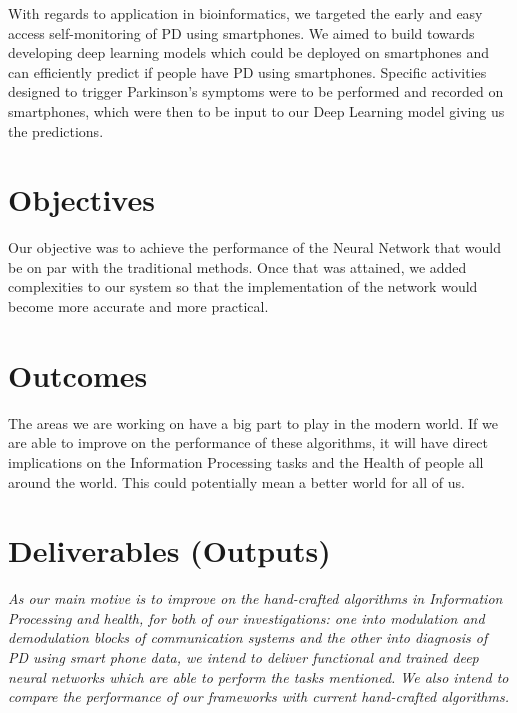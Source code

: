 With regards to application in bioinformatics, we targeted the early and easy access self-monitoring of PD using smartphones. We aimed to build towards developing deep learning models which could be deployed on smartphones and can efficiently predict if people have PD using smartphones. Specific activities designed to trigger Parkinson's symptoms were to be performed and recorded on smartphones, which were then to be input to our Deep Learning model giving us the predictions.
\section{Objectives}
Our objective was to achieve the performance of the Neural Network that would be on par with the traditional methods. Once that was attained, we added complexities to our system so that the implementation of the network would become more accurate and more practical.  
\section{Outcomes}
The areas we are working on have a big part to play in the modern world. If we are able to improve on the performance of these algorithms, it will have direct implications on the Information Processing tasks and the Health of people all around the world. This could potentially mean a better world for all of us.
\section{Deliverables (Outputs)}
\textit{As our main motive is to improve on the hand-crafted algorithms in Information Processing and health, for both of our investigations: one into modulation and demodulation blocks of communication systems and the other into diagnosis of PD using smart phone data, we intend to deliver functional and trained deep neural networks which are able to perform the tasks mentioned. We also intend to compare the performance of our frameworks with current hand-crafted algorithms.}
